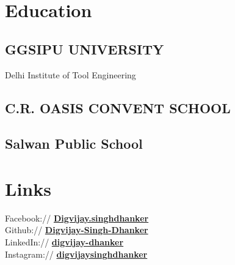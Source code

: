 \documentclass[]{deedy-resume-openfont}
\begin{document}
%
%
\lastupdated

%
%

%
%

\begin{minipage}[t]{0.33\textwidth} 


\section{Education} 

\subsection{GGSIPU UNIVERSITY}
Delhi Institute of Tool Engineering \\




\subsection{C.R. OASIS CONVENT SCHOOL}
\sectionsep
\subsection{Salwan Public School}
\sectionsep


\section{Links} 
Facebook:// \href{https://www.facebook.com/Digvijay.singhdhanker/}{\bf Digvijay.singhdhanker} \\
Github:// \href{https://github.com/Digvijay-Singh-Dhanker}{\bf Digvijay-Singh-Dhanker} \\
LinkedIn://  \href{https://www.linkedin.com/in/digvijay-dhanker-359259176/}{\bf digvijay-dhanker} \\
Instagram://  \href{https://www.instagram.com/digvijaysinghdhanker/?hl=en}{\bf digvijaysinghdhanker}




\end{minipage}
\end{document}
